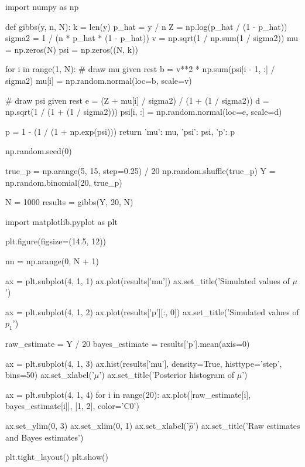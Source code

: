 \begin{python}
import numpy as np

def gibbs(y, n, N):
    k = len(y)
    p_hat = y / n
    Z = np.log(p_hat / (1 - p_hat))
    sigma2 = 1 / (n * p_hat * (1 - p_hat))
    v = np.sqrt(1 / np.sum(1 / sigma2))
    mu = np.zeros(N)
    psi = np.zeros((N, k))
    
    for i in range(1, N):
        # draw mu given rest
        b = v**2 * np.sum(psi[i - 1, :] / sigma2)
        mu[i] = np.random.normal(loc=b, scale=v)
        
        # draw psi given rest
        e = (Z + mu[i] / sigma2) / (1 + (1 / sigma2))
        d = np.sqrt(1 / (1 + (1 / sigma2)))
        psi[i, :] = np.random.normal(loc=e, scale=d)
        
    p = 1 - (1 / (1 + np.exp(psi)))
    return {
        'mu': mu,
        'psi': psi,
        'p': p
    }
\end{python}

\begin{python}
np.random.seed(0)

true_p = np.arange(5, 15, step=0.25) / 20
np.random.shuffle(true_p)
Y = np.random.binomial(20, true_p)

N = 1000
results = gibbs(Y, 20, N)
\end{python}

\begin{python}
import matplotlib.pyplot as plt

plt.figure(figsize=(14.5, 12))

nn = np.arange(0, N + 1)

ax = plt.subplot(4, 1, 1)
ax.plot(results['mu'])
ax.set_title('Simulated values of $\mu$')

ax = plt.subplot(4, 1, 2)
ax.plot(results['p'][:, 0])
ax.set_title('Simulated values of $p_{1}$')


raw_estimate = Y / 20
bayes_estimate = results['p'].mean(axis=0)

ax = plt.subplot(4, 1, 3)
ax.hist(results['mu'], density=True, histtype='step', bins=50)
ax.set_xlabel('$\mu$')
ax.set_title('Posterior histogram of $\mu$')

ax = plt.subplot(4, 1, 4)
for i in range(20):
    ax.plot([raw_estimate[i], bayes_estimate[i]], [1, 2], color='C0')
    
ax.set_ylim(0, 3)
ax.set_xlim(0, 1)
ax.set_xlabel('$\hat{p}$')
ax.set_title('Raw estimates and Bayes estimates')

plt.tight_layout()
plt.show()
\end{python}

